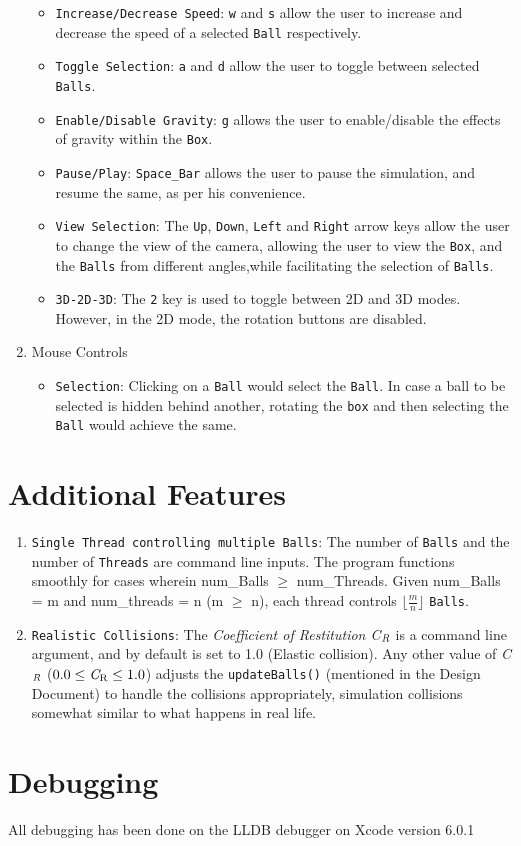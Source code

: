 \documentclass[]{article}
\newcommand{\ty}[1]{\texttt{#1}}
\begin{document}
\begin{enumerate}
\begin{flushleft}
\begin{itemize}
\item \ty{Increase/Decrease Speed}:  \ty{w} and \ty{s} allow the user to increase and decrease the speed of a selected \texttt{Ball} respectively.
\item \ty{Toggle Selection}: \ty{a} and \ty{d} allow the user to toggle between selected \texttt{Balls}. 
\item \ty{Enable/Disable Gravity}: \ty{g} allows the user to enable/disable the effects of gravity within the \texttt{Box}.
\item \ty{Pause/Play}: \ty{Space\_Bar} allows the user to pause the simulation, and resume the same, as per his convenience. 
\item \ty{View Selection}: The \ty{Up}, \ty{Down}, \ty{Left} and \ty{Right} arrow keys allow the user to change the view of the camera, allowing the user to view the \texttt{Box}, and the \texttt{Balls} from different angles,while facilitating the selection of \texttt{Balls}.
\item \ty{3D-2D-3D}: The \ty{2} key is used to toggle between 2D and 3D modes. However, in the 2D mode, the rotation buttons are disabled. 
\end{itemize}
\end{flushleft}
\item Mouse Controls
\begin{flushleft}
\begin{itemize}
\item \ty{Selection}: Clicking on a \texttt{Ball} would select the \texttt{Ball}. In case a ball to be selected is hidden behind another, rotating the \texttt{box} and then selecting the \texttt{Ball} would achieve the same.
\end{itemize}
\end{flushleft}
\end{enumerate}
\section{Additional Features}
\begin{enumerate}
\item \ty{Single \texttt{Thread} controlling multiple \texttt{Balls}}:  The number of \texttt{Balls} and the number of \texttt{Threads} are command line inputs. The program functions smoothly for cases wherein num\_Balls $\geq$ num\_Threads. Given num\_Balls = m and num\_threads = n (m $\geq$ n), each thread controls $\lfloor \frac{m}{n} \rfloor$ \texttt{Balls}.
\item \ty{Realistic Collisions}: The \emph{Coefficient of Restitution C$_{\emph{R}}$} is a command line argument, and by default is set to 1.0 (Elastic collision). Any other value of \emph{C$_{\emph{R}}$} ($ 0.0 \leq \emph{C$_{\emph{R}}$} \leq 1.0$) adjusts the \texttt{updateBalls()} (mentioned in the Design Document)  to handle the collisions appropriately, simulation collisions somewhat similar to what happens in real life. 
\end{enumerate}
\section{Debugging}
\begin{flushleft} 
All debugging has been done on the LLDB debugger on Xcode version 6.0.1
\end{flushleft}
\end{document}
